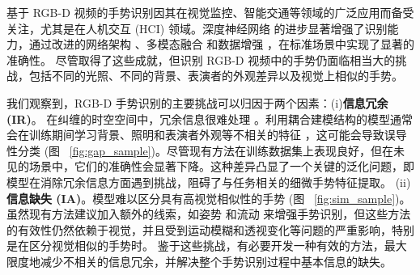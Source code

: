 基于 RGB-D 视频的手势识别因其在视觉监控、智能交通等领域的广泛应用而备受关注，尤其是在人机交互 (HCI) \cite{yu2021searching} 领域。深度神经网络 \cite{zhou2023unified,li2021trear} 的进步显著增强了识别能力，通过改进的网络架构 \cite{zhu2019redundancy,zhu2018continuous,zhou2022decoupling}、多模态融合 \cite{li2021trear,narayana2018focus,yu2021searching} 和数据增强 \cite{li2021trear,zuo2023natural}，在标准场景中实现了显著的准确性。
尽管取得了这些成就，但识别 RGB-D 视频中的手势仍面临相当大的挑战，包括不同的光照、不同的背景、表演者的外观差异以及视觉上相似的手势。

我们观察到，RGB-D 手势识别的主要挑战可以归因于两个因素：(i)\textbf{信息冗余 (IR)}。
在纠缠的时空空间中，冗余信息很难处理 \cite{zhou2023unified, LI2024110536}。利用耦合建模结构的模型通常会在训练期间学习背景、照明和表演者外观等不相关的特征 \cite{zhou2023unified}，这可能会导致误导性分类 (图 ~\ref{fig:gap_sample})。尽管现有方法在训练数据集上表现良好，但在未见的场景中，它们的准确性会显著下降。这种差异凸显了一个关键的泛化问题，即模型在消除冗余信息方面遇到挑战，阻碍了与任务相关的细微手势特征提取。
(ii)\textbf{信息缺失 (IA)}。模型难以区分具有高视觉相似性的手势 (图 ~\ref{fig:sim_sample})。虽然现有方法建议加入额外的线索，如姿势 \cite{wan2016chalearn,zuo2023natural} 和流动 \cite{narayana2018focus} 来增强手势识别，但这些方法的有效性仍然依赖于视觉，并且受到运动模糊和透视变化等问题的严重影响，特别是在区分视觉相似的手势时。
鉴于这些挑战，有必要开发一种有效的方法，最大限度地减少不相关的信息冗余，并解决整个手势识别过程中基本信息的缺失。

